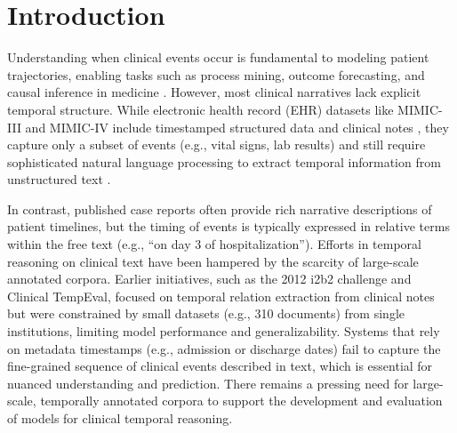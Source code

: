 \documentclass[pdflatex,sn-mathphys-num]{sn-jnl}%
\theoremstyle{thmstyleone}%
\theoremstyle{thmstyletwo}%
\theoremstyle{thmstylethree}%
\begin{document}

\maketitle


\section{Introduction}
\label{sec:introduction}

Understanding when clinical events occur is fundamental to modeling patient trajectories, enabling tasks such as process mining, outcome forecasting, and causal inference in medicine \citep{jensen2012mining, noren2010temporal}.
However, most clinical narratives lack explicit temporal structure. While electronic health record (EHR) datasets like MIMIC-III and MIMIC-IV include timestamped structured data and clinical notes \citep{johnson2016mimic, johnson2023mimic}, they capture only a subset of events (e.g., vital signs, lab results) and still require sophisticated natural language processing to extract temporal information from unstructured text \citep{viani2021temporal, cheng2023typed}.

In contrast, published case reports often provide rich narrative descriptions of patient timelines, but the timing of events is typically expressed in relative terms within the free text (e.g., “on day 3 of hospitalization”).
Efforts in temporal reasoning on clinical text have been hampered by the scarcity of large-scale annotated corpora.
Earlier initiatives, such as the 2012 i2b2 challenge and Clinical TempEval, focused on temporal relation extraction from clinical notes \citep{sun2013evaluating, bethard2016semeval, galvan2018investigating} but were constrained by small datasets (e.g., 310 documents) from single institutions, limiting model performance and generalizability.
Systems that rely on metadata timestamps (e.g., admission or discharge dates) fail to capture the fine-grained sequence of clinical events described in text, which is essential for nuanced understanding and prediction.
There remains a pressing need for large-scale, temporally annotated corpora to support the development and evaluation of models for clinical temporal reasoning.
\end{document}
